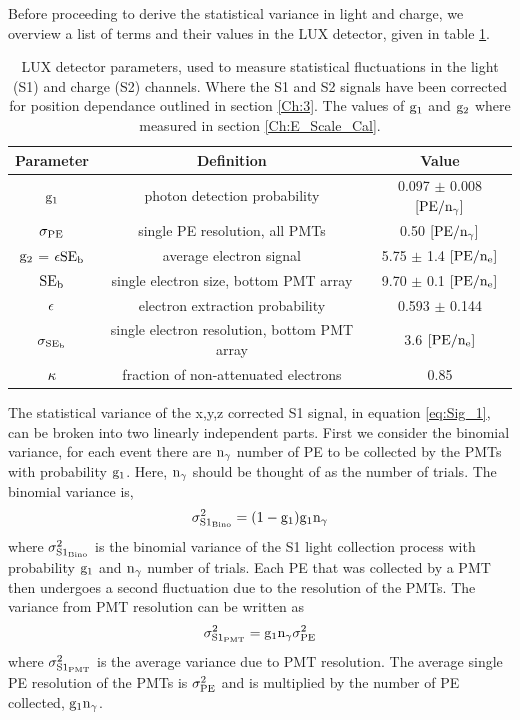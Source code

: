 Before proceeding to derive the statistical variance in light and charge, we overview a list of terms and their values in the LUX detector, given in table \ref{table:LUX_Det_Param}.

\begin{table}[h!]
\begin{center}
\begin{tabular}{|c|c|c|}
\hline
Parameter & Definition & Value
 \\ \hline
$\rm g_1$	& photon detection probability	& 0.097 $\pm$ 0.008 $\rm[PE/n_\gamma]$ \\ \hline
$\rm \sigma_{PE} $ & single PE resolution, all PMTs	& 0.50 $\rm[PE/n_\gamma]$	\\ \hline
$\rm g_2$ = $\rm \epsilon SE_b$	& average electron signal	& 5.75 $\pm$ 1.4 $\rm[PE/n_e]$ \\ \hline
$\rm SE_b$ & single electron size, bottom PMT array & 9.70 $\pm$ 0.1 $\rm [PE/n_e]$ \\ \hline
$\rm \epsilon$ & electron extraction probability & 0.593 $\pm$ 0.144 \\ \hline
$\rm \sigma_{SE_b}$ & single electron resolution, bottom PMT array & 3.6 $\rm [PE/n_e]$ \\ \hline
$\rm \kappa$	& fraction of non-attenuated electrons & 0.85 \\ \hline
\end{tabular}
\caption{LUX detector parameters, used to measure statistical fluctuations in the light (S1) and charge (S2) channels. Where the S1 and S2 signals have been corrected for position dependance outlined in section \ref{Ch:3}. The values of $\rm g_1$ and $\rm g_2$ where measured in section \ref{Ch:E_Scale_Cal}. }
\label{table:LUX_Det_Param}
\end{center}
\end{table}


The statistical variance of the x,y,z corrected S1 signal, in equation \ref{eq:Sig_1}, can be broken into two linearly independent parts. First we consider the binomial variance, for each event there are $\rm n_\gamma$ number of PE to be collected by the PMTs with probability $\rm g_1$. Here, $\rm n_\gamma$ should be thought of as the number of trials. The binomial variance is,
\begin{equation}
\rm \sigma_{S1_{Bino}}^2 = (1-g_1) g_1 n_\gamma
\label{eq:S1_bino} 
\end{equation}
\noindent where $\rm \sigma_{S1_{Bino}}^2$ is the binomial variance of the S1 light collection process with probability $\rm g_1$ and $\rm n_\gamma$ number of trials. Each PE that was collected by a PMT then undergoes a second fluctuation due to the resolution of the PMTs. The variance from PMT resolution can be written as
\begin{equation}
\rm \sigma_{S1_{PMT}}^2 = g_1 n_\gamma \sigma_{PE}^2
\label{eq:S1_pmt}
\end{equation}
\noindent where $\rm \sigma_{S1_{PMT}}^2$ is the average variance due to PMT resolution. The average single PE resolution of the PMTs is $\rm \sigma_{PE}^2$ and is multiplied by the number of PE collected, $\rm g_1n_\gamma$. 


